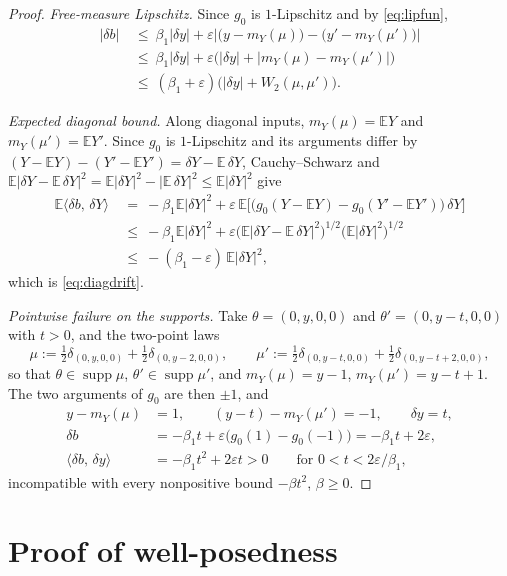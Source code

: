 \documentclass[preprint,12pt]{elsarticle}
\newcommand{\E}{\mathbb{E}}
\newcommand{\inner}[2]{\langle #1,\,#2\rangle}
\numberwithin{equation}{section}
\theoremstyle{plain}
\theoremstyle{definition}
\theoremstyle{\PaperRemarkStyle}
\begin{document}
\begin{proof}
\emph{Free-measure Lipschitz.} Since $g_0$ is $1$-Lipschitz and by \eqref{eq:lipfun},
\[
\begin{aligned}
|\delta b|&\ \le\ \beta_1|\delta y|
+\varepsilon\bigl|\bigl(y-m_Y(\mu)\bigr)-\bigl(y'-m_Y(\mu')\bigr)\bigr|\\
&\ \le\ \beta_1|\delta y|+\varepsilon\bigl(|\delta y|+|m_Y(\mu)-m_Y(\mu')|\bigr)\\
&\ \le\ (\beta_1+\varepsilon)\bigl(|\delta y|+W_2(\mu,\mu')\bigr).
\end{aligned}
\]

\emph{Expected diagonal bound.} Along diagonal inputs, $m_Y(\mu)=\E Y$ and
$m_Y(\mu')=\E Y'$. Since $g_0$ is $1$-Lipschitz and its arguments differ by
$(Y-\E Y)-(Y'-\E Y')=\delta Y-\E\,\delta Y$, Cauchy--Schwarz and
$\E|\delta Y-\E\,\delta Y|^2=\E|\delta Y|^2-|\E\,\delta Y|^2\le\E|\delta Y|^2$ give
\[
\begin{aligned}
\E\inner{\delta b}{\delta Y}
&\ =\ -\beta_1\E|\delta Y|^2
+\varepsilon\,\E\bigl[\bigl(g_0(Y-\E Y)-g_0(Y'-\E Y')\bigr)\,\delta Y\bigr]\\
&\ \le\ -\beta_1\E|\delta Y|^2
+\varepsilon\bigl(\E|\delta Y-\E\,\delta Y|^2\bigr)^{1/2}\bigl(\E|\delta Y|^2\bigr)^{1/2}\\
&\ \le\ -(\beta_1-\varepsilon)\,\E|\delta Y|^2 ,
\end{aligned}
\]
which is \eqref{eq:diagdrift}.

\emph{Pointwise failure on the supports.} Take $\theta=(0,y,0,0)$ and
$\theta'=(0,y-t,0,0)$ with $t>0$, and the two-point laws
\[
\mu:=\tfrac12\delta_{(0,y,0,0)}+\tfrac12\delta_{(0,y-2,0,0)},\qquad
\mu':=\tfrac12\delta_{(0,y-t,0,0)}+\tfrac12\delta_{(0,y-t+2,0,0)},
\]
so that $\theta\in\operatorname{supp}\mu$, $\theta'\in\operatorname{supp}\mu'$, and
$m_Y(\mu)=y-1$, $m_Y(\mu')=y-t+1$. The two arguments of $g_0$ are then $\pm1$, and
\[
\begin{aligned}
y-m_Y(\mu)&=1, \qquad (y-t)-m_Y(\mu')=-1, \qquad \delta y=t,\\
\delta b&=-\beta_1t+\varepsilon\bigl(g_0(1)-g_0(-1)\bigr)=-\beta_1t+2\varepsilon,\\
\inner{\delta b}{\delta y}&=-\beta_1t^2+2\varepsilon t>0
\qquad\text{for }0<t<2\varepsilon/\beta_1,
\end{aligned}
\]
incompatible with every nonpositive bound $-\beta t^2$, $\beta\ge0$.
\end{proof}

 \section{Proof of well-posedness}
\label{sec:wp-proof}
\end{document}
